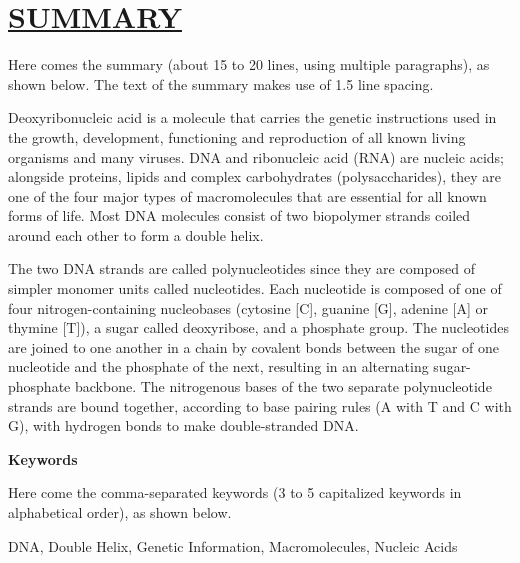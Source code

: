 \section*{\uline{SUMMARY}}
Here comes the summary (about 15 to 20 lines, using multiple paragraphs), as shown below. The text of the summary makes use of 1.5 line spacing.

\noindent Deoxyribonucleic acid is a molecule that carries the genetic instructions used in the growth, development, functioning and reproduction of all known living organisms and many viruses. DNA and ribonucleic acid (RNA) are nucleic acids; alongside proteins, lipids and complex carbohydrates (polysaccharides), they are one of the four major types of macromolecules that are essential for all known forms of life. Most DNA molecules consist of two biopolymer strands coiled around each other to form a double helix.

\noindent The two DNA strands are called polynucleotides since they are composed of simpler monomer units called nucleotides. Each nucleotide is composed of one of four nitrogen-containing nucleobases (cytosine [C], guanine [G], adenine [A] or thymine [T]), a sugar called deoxyribose, and a phosphate group. The nucleotides are joined to one another in a chain by covalent bonds between the sugar of one nucleotide and the phosphate of the next, resulting in an alternating sugar-phosphate backbone. The nitrogenous bases of the two separate polynucleotide strands are bound together, according to base pairing rules (A with T and C with G), with hydrogen bonds to make double-stranded DNA.

\vspace{1cm}

\noindent\textbf{Keywords}

\bigskip

\noindent Here come the comma-separated keywords (3 to 5 capitalized keywords in alphabetical order), as shown below.

\bigskip

\noindent DNA, Double Helix, Genetic Information, Macromolecules, Nucleic Acids

\pagebreak

\clearpage\mbox{}\clearpage